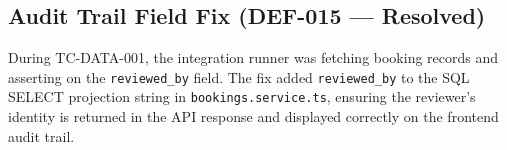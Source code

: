 \documentclass[11pt,a4paper]{article}
\begin{document}
\subsection{Audit Trail Field Fix (DEF-015 --- Resolved)}
During TC-DATA-001, the integration runner was fetching booking records and asserting on the \texttt{reviewed\_by} field. The fix added \texttt{reviewed\_by} to the SQL SELECT projection string in \texttt{bookings.service.ts}, ensuring the reviewer's identity is returned in the API response and displayed correctly on the frontend audit trail.
\end{document}

